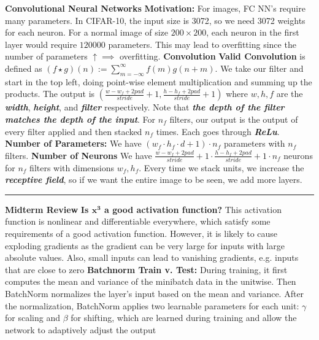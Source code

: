 \documentclass{article}
\renewcommand{\bf}[1]{\textbf{{#1}}}
\renewcommand{\it}[1]{\textit{{#1}}}
\newcommand{\ib}[1]{\textit{\textbf{{#1}}}}
\begin{document}
\begin{small}
\bf{Convolutional Neural Networks}
\bf{Motivation:} For images, FC NN's require many parameters. In CIFAR-10, the input size is 3072,
so we need 3072 weights for each neuron. For a normal image of size $200 \times 200$, each neuron in
the first layer would require $120000$ parameters. This may lead to overfitting since
the number of parameters $\uparrow \implies$ overfitting.
\newline
\bf{Convolution}
\newline
\bf{Valid Convolution} is defined as $(f \star g)(n) := \sum_{m = -\infty}^{\infty} f(m) g(n + m)$.
We take our filter and start in the top left, doing point-wise element multiplication and summing up
the products. The output is 
$\left(
    \frac{w - w_f + 2\it{pad}}{\it{stride}} + 1, \frac{h - h_f + 2 \it{pad}}{\it{stride}} + 1 
\right)$ where $w, h, f$ are the \ib{width}, \ib{height}, and \ib{filter} respectively. Note that
\ib{the depth of the filter matches the depth of the input}. For $n_f$ filters, our output is the
output of every filter applied and then stacked $n_f$ times. Each goes through \ib{ReLu}.
\newline
\bf{Number of Parameters:} We have $(w_f \cdot h_f \cdot d + 1) \cdot n_f$ parameters with $n_f$ 
filters.
\newline
\bf{Number of Neurons} We have 
$
\frac{w - w_f + 2\it{pad}}{\it{stride}} + 1 
\cdot \frac{h - h_f + 2 \it{pad}}{\it{stride}} + 1 
\cdot n_f$ neurons for $n_f$ filters with dimensions $w_f, h_f$. Every time we stack units, we
increase the \ib{receptive field}, so if we want the entire image to be seen, we add more layers.
\hrule
\vspace{0.1em}
\bf{Midterm Review}
\newline
\bf{Is $\bm{x^3}$ a good activation function?}
This activation function is nonlinear and differentiable everywhere, which satisfy some requirements 
of a good activation function. However, it is likely to cause exploding gradients as the gradient 
can be very large for inputs with large absolute values. Also, small inputs can lead to vanishing
gradients, e.g. inputs that are close to zero
\newline
\bf{Batchnorm Train v. Test:}
During training, it first computes the mean and variance of the minibatch data in the unitwise.
Then BatchNorm normalizes the layer's input based on the mean and variance. After the normalization,
BatchNorm applies two learnable parameters for each unit: $\gamma$ for scaling and $\beta$ for 
shifting, which are learned during training and allow the network to adaptively adjust the output

\end{small}
\end{document}

